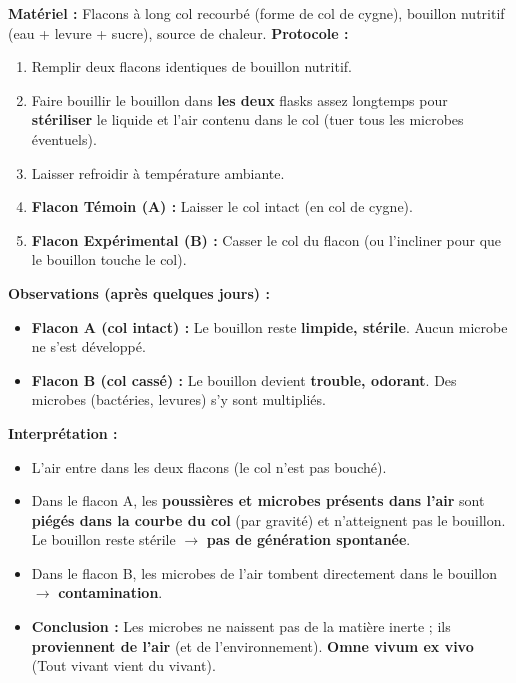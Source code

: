 \documentclass[11pt]{article}
\begin{document}
\begin{experience}
\textbf{Matériel :} Flacons à long col recourbé (forme de col de cygne), bouillon nutritif (eau + levure + sucre), source de chaleur.
\textbf{Protocole :}
\begin{enumerate}
    \item Remplir deux flacons identiques de bouillon nutritif.
    \item Faire bouillir le bouillon dans \textbf{les deux} flasks assez longtemps pour \textbf{stériliser} le liquide et l'air contenu dans le col (tuer tous les microbes éventuels).
    \item Laisser refroidir à température ambiante.
    \item \textbf{Flacon Témoin (A) :} Laisser le col intact (en col de cygne).
    \item \textbf{Flacon Expérimental (B) :} Casser le col du flacon (ou l'incliner pour que le bouillon touche le col).
\end{enumerate}
\textbf{Observations (après quelques jours) :}
\begin{itemize}
    \item \textbf{Flacon A (col intact) :} Le bouillon reste \textbf{limpide, stérile}. Aucun microbe ne s'est développé.
    \item \textbf{Flacon B (col cassé) :} Le bouillon devient \textbf{trouble, odorant}. Des microbes (bactéries, levures) s'y sont multipliés.
\end{itemize}
\textbf{Interprétation :}
\begin{itemize}
    \item L'air entre dans les deux flacons (le col n'est pas bouché).
    \item Dans le flacon A, les \textbf{poussières et microbes présents dans l'air} sont \textbf{piégés dans la courbe du col} (par gravité) et n'atteignent pas le bouillon. Le bouillon reste stérile $\to$ \textbf{pas de génération spontanée}.
    \item Dans le flacon B, les microbes de l'air tombent directement dans le bouillon $\to$ \textbf{contamination}.
    \item \textbf{Conclusion :} Les microbes ne naissent pas de la matière inerte ; ils \textbf{proviennent de l'air} (et de l'environnement). \og \textbf{Omne vivum ex vivo} \fg (Tout vivant vient du vivant).
\end{itemize}
\end{experience}
\end{document}
